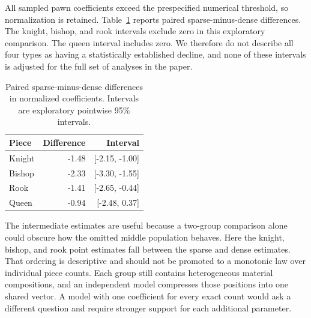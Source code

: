 All sampled pawn coefficients exceed the prespecified numerical threshold, so normalization is retained. Table~\ref{tab:countcontrast} reports paired sparse-minus-dense differences. The knight, bishop, and rook intervals exclude zero in this exploratory comparison. The queen interval includes zero. We therefore do not describe all four types as having a statistically established decline, and none of these intervals is adjusted for the full set of analyses in the paper.
\begin{table}[htbp]\centering
\small
\caption{Paired sparse-minus-dense differences in normalized coefficients. Intervals are exploratory pointwise 95\% intervals.}\label{tab:countcontrast}
\begin{tabular}{lrr}
\toprule
Piece & Difference & Interval\\\midrule
Knight & -1.48 & [-2.15, -1.00]\\
Bishop & -2.33 & [-3.30, -1.55]\\
Rook & -1.41 & [-2.65, -0.44]\\
Queen & -0.94 & [-2.48, 0.37]\\
\bottomrule\end{tabular}\end{table}

The intermediate estimates are useful because a two-group comparison alone could obscure how the omitted middle population behaves. Here the knight, bishop, and rook point estimates fall between the sparse and dense estimates. That ordering is descriptive and should not be promoted to a monotonic law over individual piece counts. Each group still contains heterogeneous material compositions, and an independent model compresses those positions into one shared vector. A model with one coefficient for every exact count would ask a different question and require stronger support for each additional parameter.

